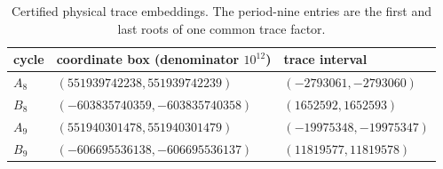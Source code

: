\begin{table}[h]
\centering
\caption{Certified physical trace embeddings.  The period-nine entries are
the first and last roots of one common trace factor.}
\label{tab:physical}
\begin{tabular}{@{}lll@{}}
\toprule
cycle & coordinate box (denominator $10^{12}$) & trace interval\\
\midrule
$A_8$ & $(551939742238,551939742239)$ & $(-2793061,-2793060)$\\
$B_8$ & $(-603835740359,-603835740358)$ & $(1652592,1652593)$\\
$A_9$ & $(551940301478,551940301479)$ & $(-19975348,-19975347)$\\
$B_9$ & $(-606695536138,-606695536137)$ & $(11819577,11819578)$\\
\bottomrule
\end{tabular}
\end{table}

